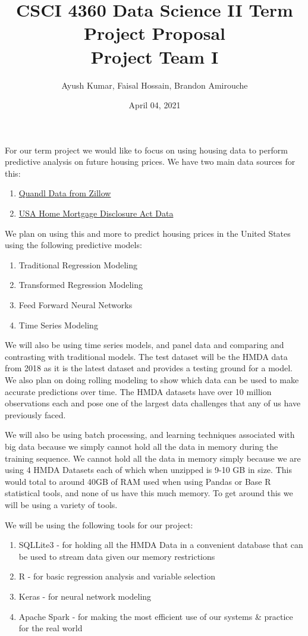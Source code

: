 \documentclass{article}
\title{CSCI 4360 Data Science II Term Project Proposal\\
		Project Team I}
\author{Ayush Kumar, Faisal Hossain, Brandon Amirouche}
\date{April 04, 2021}
\begin{document}
	
	\maketitle
	
	For our term project we would like to focus on using housing data to perform predictive 
	analysis on future housing prices. We have two main data sources for this: 
	
	\begin{enumerate}
		\item  \href{https://www.quandl.com/databases/ZILLOW/data}{Quandl Data from Zillow}
		\item \href{https://www.consumerfinance.gov/data-research/hmda/historic-data/?geo=nationwide&records=all-records&field_descriptions=labels}{USA Home Mortgage Disclosure Act Data}
	\end{enumerate}
	
	We plan on using this and more to predict housing prices in the United States using the following predictive models: 
	
	\begin{enumerate}
		\item Traditional Regression Modeling 
		\item Transformed Regression Modeling 
		\item Feed Forward Neural Networks 
		\item Time Series Modeling
	\end{enumerate}

	We will also be using time series models, and panel data and comparing and contrasting with traditional models. The test dataset will be the HMDA data from 2018 as it is the latest dataset and provides a testing ground for a model. We also plan on doing rolling modeling to show which data can be used to make 
	accurate predictions over time. The HMDA datasets have over 10 million observations each and pose one of the largest data challenges that any of us have previously faced. 
	
	We will also be using batch processing, and learning techniques associated with big data because we simply cannot hold all the data in memory during the training sequence. We cannot hold all the data in memory simply because we are using 4 HMDA Datasets each of which when unzipped is 9-10 GB in size. This would total to around 40GB of RAM used when using Pandas or Base R statistical tools, and none of us have this much memory. To get around this we will be using a variety of tools. 
	
	We will be using the following tools for our project: 
	
	\begin{enumerate}
		\item SQLLite3 - for holding all the HMDA Data in a convenient database that can be used
		to stream data given our memory restrictions 
		\item R - for basic regression analysis and variable selection 
		\item Keras - for neural network modeling 
		\item Apache Spark - for making the most efficient use of our systems \& practice for the real world 		
	\end{enumerate}

	
\end{document}
